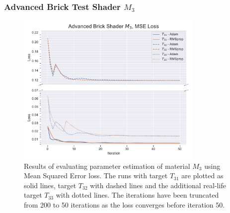\subsubsection{Advanced Brick Test Shader $M_3$}
\begin{figure}[hp]
    \centering
    \includegraphics[width=0.8\textwidth]{img/evaluation/M3/ABS_MSE.pdf}
    \caption{Results of evaluating parameter estimation of material $M_3$ using Mean Squared Error loss. The runs with target $T_{31}$ are plotted as solid lines, target $T_{32}$ with dashed lines and the additional real-life target $T_{33}$ with dotted lines. The iterations have been truncated from 200 to 50 iterations as the loss converges before iteration 50.}
    \label{fig:M3MSEData}
\end{figure}

